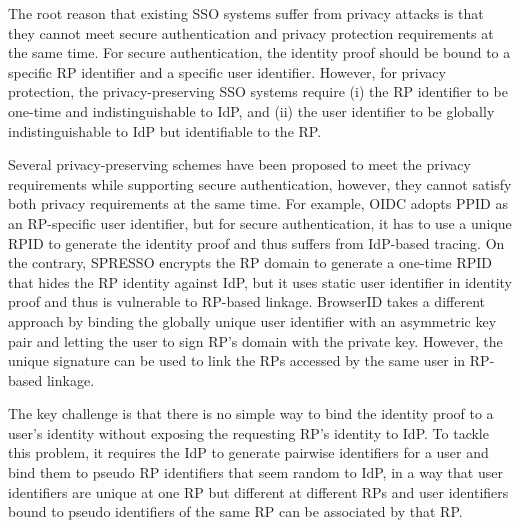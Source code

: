 {\color{red}
The root reason that existing SSO systems suffer from privacy attacks is that they cannot meet secure authentication and privacy protection requirements
at the same time. %
For secure authentication, the identity proof should be bound to a specific RP identifier and a specific user identifier. %
However, for privacy protection, the privacy-preserving SSO systems require (i) the RP identifier to be one-time and indistinguishable to IdP, and (ii) the user identifier to be globally indistinguishable to IdP but identifiable to the RP. %

Several privacy-preserving schemes have been proposed to meet the privacy requirements while supporting secure authentication, however, they cannot satisfy both privacy requirements at the same time. For example, OIDC adopts PPID as an RP-specific user identifier, but for secure authentication, it has to use a unique RPID to generate the identity proof and thus suffers from IdP-based tracing. On the contrary, SPRESSO encrypts the RP domain to generate a one-time RPID that hides the RP identity against IdP, but it uses static user identifier in identity proof and thus is vulnerable to RP-based linkage. BrowserID takes a different approach by binding the globally unique user identifier with an asymmetric key pair and letting the user to sign RP's domain with the private key. However, the unique signature can be used to link the RPs accessed by the same user in RP-based linkage.

The key challenge is that there is no simple way to bind the identity proof to a user's identity without exposing the requesting RP's identity to IdP. To tackle this problem, it requires the IdP to generate pairwise identifiers for a user and bind them to pseudo RP identifiers that seem random to IdP, in a way that user identifiers are unique at one RP but different at different RPs and user identifiers bound to pseudo identifiers of the same RP can be associated by that RP.
}

